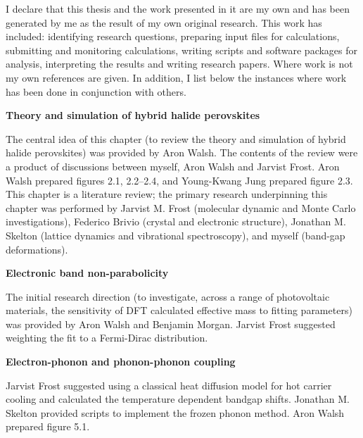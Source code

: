 I declare that this thesis and the work presented in it are my own and has been generated by me as the result of my own original research. This work has included: identifying research questions, preparing input files for calculations, submitting and monitoring calculations, writing scripts and software packages for analysis, interpreting the results and writing research papers. Where work is not my own references are given. In addition, I list below the instances where work has been done in conjunction with others.
\vspace{\frontmatterbaselineskip}

\textbf{Theory and simulation of hybrid halide perovskites } 

The central idea of this chapter (to review the theory and simulation of hybrid halide perovskites) was provided by Aron Walsh. The contents of the review were a product of discussions between myself, Aron Walsh and Jarvist Frost. Aron Walsh prepared figures 2.1, 2.2--2.4, and Young-Kwang Jung prepared figure 2.3. This chapter is a literature review; the primary research underpinning this chapter was performed by Jarvist M. Frost (molecular dynamic and Monte Carlo investigations), Federico Brivio (crystal and electronic structure), Jonathan M. Skelton (lattice dynamics and vibrational spectroscopy), and myself (band-gap deformations).

\vspace{\frontmatterbaselineskip}

\textbf{Electronic band non-parabolicity}

The initial research direction (to investigate, across a range of photovoltaic materials, the sensitivity of DFT calculated effective mass to fitting parameters) was provided by Aron Walsh and Benjamin Morgan. Jarvist Frost suggested weighting the fit to a Fermi-Dirac distribution. 

\vspace{\frontmatterbaselineskip}

\textbf{Electron-phonon and phonon-phonon coupling}

Jarvist Frost suggested using a classical heat diffusion model for hot carrier cooling and calculated the temperature dependent bandgap shifts. Jonathan M. Skelton provided scripts to implement the frozen phonon method. Aron Walsh prepared figure 5.1.

